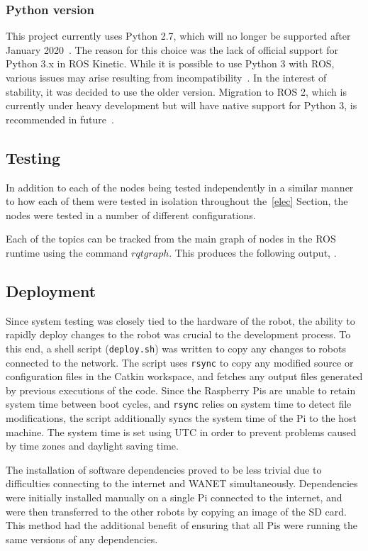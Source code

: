 \subsubsection{Python version}
This project currently uses Python 2.7, which will no longer be supported
after January 2020~\cite{python2-eol}. The reason for this choice was the
lack of official support for Python 3.x in ROS Kinetic. While it is
possible to use Python 3 with ROS, various issues may arise resulting from
incompatibility~\cite{medium-ros-python3}. In the interest of stability,
it was decided to use the older version. Migration to ROS 2, which is
currently under heavy development but will have native support for Python
3, is recommended in future~\cite{ros2}.

\subsection{Testing}\label{soft/ROS/test}
In addition to each of the nodes being tested independently in a similar
manner to how each of them were tested in isolation throughout the~\ref{elec}
Section, the nodes were tested in a number of different
configurations.

Each of the topics can be tracked from the main graph of nodes in the ROS
runtime using the command $rqt graph$. This produces the following output,
.


\subsection{Deployment}\label{soft/ROS/deploy}
Since system testing was closely tied to the hardware of the robot, the
ability to rapidly deploy changes to the robot was crucial to the
development process. To this end, a shell script (\verb|deploy.sh|) was
written to copy any changes to robots connected to the network. The script
uses \verb|rsync| to copy any modified source or configuration files in
the Catkin workspace, and fetches any output files generated by previous
executions of the code. Since the Raspberry Pis are unable to retain
system time between boot cycles, and \verb|rsync| relies on system time to
detect file modifications, the script additionally syncs the system time
of the Pi to the host machine. The system time is set using UTC in order
to prevent problems caused by time zones and daylight saving time.

The installation of software dependencies proved to be less trivial due to
difficulties connecting to the internet and WANET simultaneously.
Dependencies were initially installed manually on a single Pi connected to
the internet, and were then transferred to the other robots by copying an
image of the SD card. This method had the additional benefit of ensuring
that all Pis were running the same versions of any dependencies.

